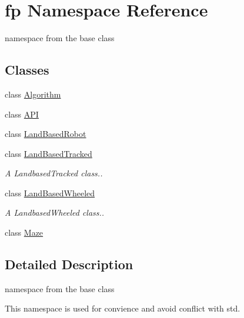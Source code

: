 \hypertarget{namespacefp}{}\section{fp Namespace Reference}
\label{namespacefp}


namespace from the base class  


\subsection*{Classes}
\begin{DoxyCompactItemize}
\item 
class \hyperlink{classfp_1_1_algorithm}{Algorithm}
\item 
class \hyperlink{classfp_1_1_a_p_i}{A\+PI}
\item 
class \hyperlink{classfp_1_1_land_based_robot}{Land\+Based\+Robot}
\item 
class \hyperlink{classfp_1_1_land_based_tracked}{Land\+Based\+Tracked}
\begin{DoxyCompactList}\small\item\em A Landbased\+Tracked class.. \end{DoxyCompactList}\item 
class \hyperlink{classfp_1_1_land_based_wheeled}{Land\+Based\+Wheeled}
\begin{DoxyCompactList}\small\item\em A Landbased\+Wheeled class.. \end{DoxyCompactList}\item 
class \hyperlink{classfp_1_1_maze}{Maze}
\end{DoxyCompactItemize}


\subsection{Detailed Description}
namespace from the base class 

This namespace is used for convience and avoid conflict with std. 